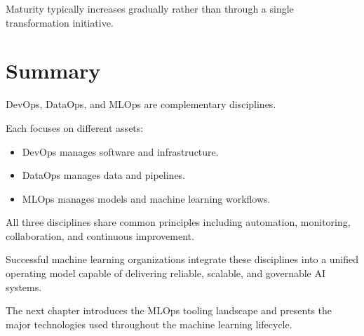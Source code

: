 Maturity typically increases gradually rather than through a single transformation initiative.

\section{Summary}

DevOps, DataOps, and MLOps are complementary disciplines.

Each focuses on different assets:

\begin{itemize}
    \item DevOps manages software and infrastructure.
    \item DataOps manages data and pipelines.
    \item MLOps manages models and machine learning workflows.
\end{itemize}

All three disciplines share common principles including automation, monitoring, collaboration, and continuous improvement.

Successful machine learning organizations integrate these disciplines into a unified operating model capable of delivering reliable, scalable, and governable AI systems.

The next chapter introduces the MLOps tooling landscape and presents the major technologies used throughout the machine learning lifecycle.